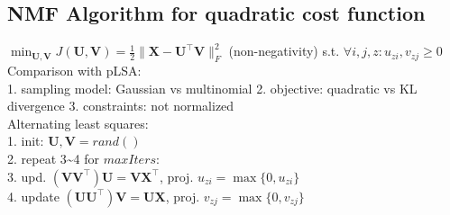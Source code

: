 \subsection*{NMF Algorithm for quadratic cost function}

$\min_{\mathbf{U}, \mathbf{V}} J(\mathbf{U}, \mathbf{V}) = \frac{1}{2} \|\mathbf{X} - \mathbf{U}^\top\mathbf{V}\|_F^2$ (non-negativity)
s.t. $\forall i,j,z:u_{zi},v_{zj} \geq 0 $ \\
Comparison with pLSA:\\
1. sampling model: Gaussian vs multinomial
2. objective: quadratic vs KL divergence
3. constraints: not normalized \\
Alternating least squares:\\
1. init: $\mathbf{U}, \mathbf{V} = rand()$\\ 2. repeat 3\textasciitilde4 for $\mathit{maxIters}$:\\
3. upd. $(\mathbf{VV}^\top)\mathbf{U} = \mathbf{VX}^\top$, proj. $u_{zi} = \max \{ 0, u_{zi} \}$\\
4. update $(\mathbf{UU}^\top)\mathbf{V} = \mathbf{UX}$, proj. $v_{zj} = \max \{ 0, v_{zj} \}$
